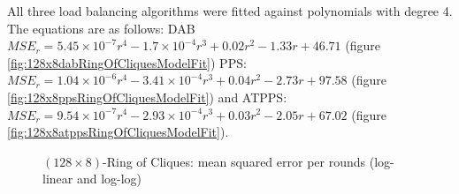 All three load balancing algorithms were fitted against polynomials with degree 4. The equations are as follows: DAB $MSE_r=5.45\times 10 ^{-7}r^{4}-1.7\times 10^{-4}r^{3}+0.02r^{2}-1.33r+46.71$ (figure \ref{fig:128x8dabRingOfCliquesModelFit}) PPS: $MSE_r=1.04\times 10 ^{-6}r^{4}-3.41\times 10^{-4}r^{3}+0.04r^{2}-2.73r+97.58$ (figure \ref{fig:128x8ppsRingOfCliquesModelFit}) and ATPPS: $MSE_r=9.54\times 10^{-7}r^{4}-2.93\times 10^{-4}r^{3}+0.03r^{2}-2.05r+67.02$ (figure \ref{fig:128x8atppsRingOfCliquesModelFit}).
\begin{figure}[!ht]
    \centering
    \hfil
    \caption{$(128\times8)$-Ring of Cliques: mean squared error per rounds (log-linear and log-log)}
        \label{fig:128x8RingOfCliquesLog_LogLog}
\end{figure}

